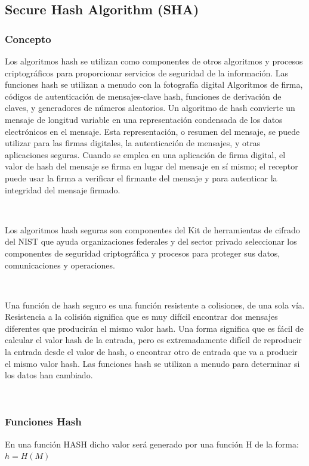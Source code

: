 \documentclass[11pt, conference]{IEEEtran}
\begin{document}
\subsection{\bf Secure Hash Algorithm (SHA)}
\subsubsection{Concepto}
Los algoritmos hash se utilizan como componentes de otros algoritmos y procesos criptográficos para proporcionar servicios de seguridad de la información. Las funciones hash se utilizan a menudo con la fotografía digital Algoritmos de firma, códigos de autenticación de mensajes-clave hash, funciones de derivación de claves, y generadores de números aleatorios. Un algoritmo de hash convierte un mensaje de longitud variable en  una representación condensada de los datos electrónicos en el mensaje. Esta representación, o resumen del mensaje, se puede utilizar para las firmas digitales, la autenticación de mensajes, y otras aplicaciones seguras. Cuando se emplea en una aplicación de firma digital, el valor de hash del mensaje se firma en lugar del mensaje en sí mismo; el receptor puede usar la firma a verificar el firmante del mensaje y para autenticar la integridad del mensaje firmado.\cite{f}

\

Los algoritmos hash seguras son componentes del Kit de herramientas de cifrado del NIST que ayuda organizaciones federales y del sector privado seleccionar los componentes de seguridad criptográfica y procesos para proteger sus datos, comunicaciones y operaciones. 

\

Una función de hash seguro es una función resistente a colisiones, de una sola vía. Resistencia a la colisión significa que es muy difícil encontrar dos mensajes diferentes que producirán el mismo valor hash. Una forma significa que es fácil de calcular el valor hash de la entrada, pero es extremadamente difícil de reproducir la entrada desde el valor de hash, o encontrar otro de entrada que va a producir el mismo valor hash. Las funciones hash se utilizan a menudo para determinar si los datos han cambiado.

\

\subsubsection{Funciones Hash}

En una función HASH dicho valor será generado por una función H de la forma: $h=H (M)$
\end{document}
